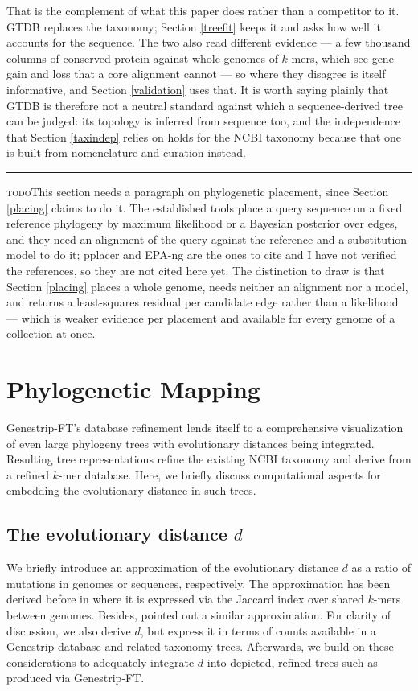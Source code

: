 \documentclass[pdflatex,sn-vancouver-num]{sn-jnl}
\newif\ifshowtodos \showtodostrue
\newcommand{\todo}[1]{%
  \ifshowtodos
    \par\addvspace{0.7\baselineskip}%
    \begin{list}{}{%
      \setlength{\leftmargin}{1.5em}%
      \setlength{\rightmargin}{1.5em}%
      \setlength{\topsep}{0pt}%
      \setlength{\partopsep}{0pt}%
      \setlength{\parsep}{0.5\baselineskip}%
      \setlength{\itemsep}{0pt}%
    }%
    \item[]\footnotesize\color{black!70}%
      \textcolor{orange!65!black}{\rule[-0.2ex]{2pt}{1.15ex}}\hspace{0.55em}%
      \textcolor{orange!65!black}{\textsc{todo}}\hspace{0.6em}\ignorespaces#1%
    \end{list}%
    \addvspace{0.7\baselineskip}%
  \fi%
}
\begin{document}
That is the complement of what this paper does rather than a competitor to it. GTDB replaces the
taxonomy; Section \ref{treefit} keeps it and asks how well it accounts for the sequence. The two also
read different evidence --- a few thousand columns of conserved protein against whole genomes of
$k$-mers, which see gene gain and loss that a core alignment cannot --- so where they disagree is
itself informative, and Section \ref{validation} uses that. It is worth saying plainly that GTDB is
therefore not a neutral standard against which a sequence-derived tree can be judged: its topology is
inferred from sequence too, and the independence that Section \ref{taxindep} relies on holds for the
NCBI taxonomy because that one is built from nomenclature and curation instead.

\todo{This section needs a paragraph on phylogenetic placement, since Section \ref{placing} claims to
do it. The established tools place a query sequence on a fixed reference phylogeny by maximum
likelihood or a Bayesian posterior over edges, and they need an alignment of the query against the
reference and a substitution model to do it; pplacer and EPA-ng are the ones to cite and I have not
verified the references, so they are not cited here yet. The distinction to draw is that
Section \ref{placing} places a whole genome, needs neither an alignment nor a model, and returns a
least-squares residual per candidate edge rather than a likelihood --- which is weaker evidence per
placement and available for every genome of a collection at once.}

\section{Phylogenetic Mapping}

Genestrip-FT's database refinement lends itself to a comprehensive visualization of even large phylogeny trees with evolutionary distances being integrated. Resulting tree representations refine the existing NCBI taxonomy \cite{taxonomy} and derive from a refined $k$-mer database. Here, we briefly discuss computational aspects for embedding the evolutionary distance in such trees.

   \subsection{The evolutionary distance $d$}
    
We briefly introduce an approximation of the evolutionary distance $d$ as a ratio of mutations in genomes or sequences, respectively. The approximation has been derived before in \cite{skmer} where it is expressed via the Jaccard index over shared $k$-mers between genomes. Besides, \cite{Ondov:2016aa} pointed out a similar approximation. For clarity of discussion, we also derive $d$, but express it in terms of counts available in a Genestrip database and related taxonomy trees. Afterwards, we build on these considerations to adequately integrate $d$ into depicted, refined trees such as produced via Genestrip-FT. 
    
\end{document}

